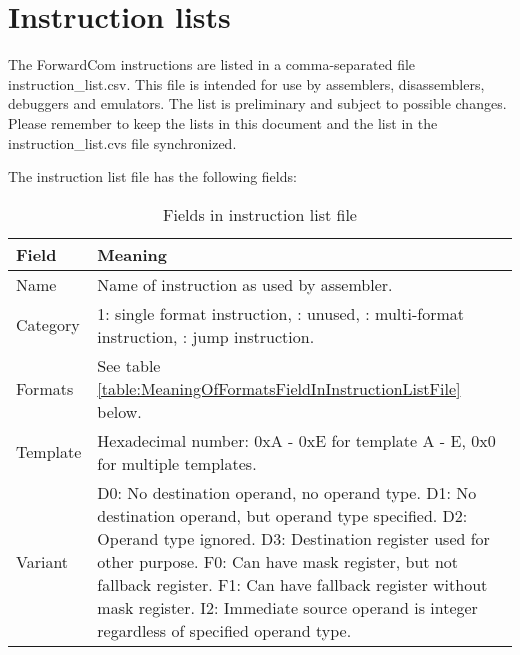 \documentclass[forwardcom.tex]{subfiles}
\begin{document}
\RaggedRight

\chapter{Instruction lists}\label{chap:InstructionLists}
The ForwardCom instructions are listed in a comma-separated file instruction\_list.csv. This file is intended for use by assemblers, disassemblers, debuggers and emulators. The list is preliminary and subject to possible changes. Please remember to keep the lists in this document and the list in the instruction\_list.cvs file synchronized.
\vv

The instruction list file has the following fields:

\begin{longtable} {|p{18mm}|p{100mm}|}
\caption{Fields in instruction list file} 
\label{table:fieldsInInstructionListFile}
\\
\endfirsthead
\endhead
\hline
\bfseries Field & \bfseries Meaning  \\
\hline
Name & Name of instruction as used by assembler.  \\
\hline
Category & 1: single format instruction, \newline
           2: unused,  \newline
           3: multi-format instruction,  \newline
           4: jump instruction. \\
\hline
Formats & See table \ref{table:MeaningOfFormatsFieldInInstructionListFile} below.  \\
\hline
Template & Hexadecimal number:  \newline
           0xA - 0xE for template A - E,  \newline
           0x0 for multiple templates. \\
\hline
Variant & 
D0:  No destination operand, no operand type.\newline
D1:  No destination operand, but operand type specified.\newline
D2:  Operand type ignored.\newline
D3:  Destination register used for other purpose.\newline
F0:  Can have mask register, but not fallback register.\newline
F1:  Can have fallback register without mask register.\newline
I2:  Immediate source operand is integer regardless of specified operand type.\newline

\end{longtable}
\end{document}

